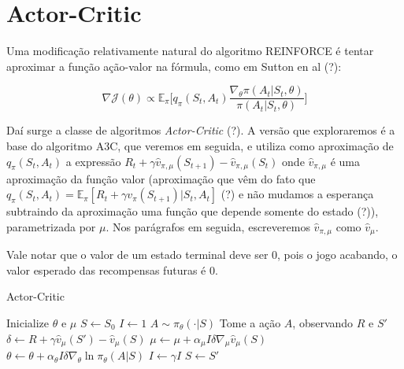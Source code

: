 \section{Actor-Critic}

Uma modificação relativamente natural do algoritmo REINFORCE é tentar aproximar a função ação-valor na fórmula, como em Sutton en al (?):

\begin{equation}
    \nabla \mathcal{J}(\theta) 
    \propto \mathbb{E}_{\pi} \Big[ q_{\pi}(S_t, A_t) \frac{\nabla_{\theta} \pi(A_t | S_t, \theta)}{\pi(A_t | S_t, \theta)} \Big]
\end{equation}

Daí surge a classe de algoritmos \textit{Actor-Critic} (?). A versão que exploraremos é a base do algoritmo A3C, que veremos em seguida, e utiliza como aproximação de $q_{\pi}(S_t, A_t)$ a expressão $R_{t} + \gamma \hat{v}_{\pi, \mu}(S_{t+1}) - \hat{v}_{\pi, \mu}(S_t)$ onde $\hat{v}_{\pi, \mu}$ é uma aproximação da função valor (aproximação que vêm do fato que $q_{\pi}(S_t, A_t) = \mathbb{E}_{\pi}[R_{t} + \gamma v_{\pi}(S_{t+1})|S_t, A_t]$ (?) e não mudamos a esperança subtraindo da aproximação uma função que depende somente do estado (?)), parametrizada por $\mu$. Nos parágrafos em seguida, escreveremos $\hat{v}_{\pi, \mu}$ como $\hat{v}_\mu$.

Vale notar que o valor de um estado terminal deve ser 0, pois o jogo acabando, o valor esperado das recompensas futuras é 0.

\begin{algorithm}
\caption{Actor-Critic}\label{ac}
\begin{algorithmic}[1]
\State Inicialize $\theta$ e $\mu$
    \State $S\gets S_0$
    \State $I\gets 1$
        \State $A \sim \pi_{\theta}(\cdot|S)$
        \State Tome a ação $A$, observando $R$ e $S'$
        \State $\delta\gets R + \gamma \hat{v}_{\mu}(S') - \hat{v}_{\mu}(S)$
        \State $\mu\gets \mu + \alpha_\mu I \delta \nabla_{\mu}\hat{v}_\mu(S)$
        \State $\theta\gets \theta + \alpha_\theta I \delta \nabla_{\theta}\ln \pi_\theta(A | S)$
        \State $I\gets \gamma I$
        \State $S\gets S'$
    \EndWhile
\EndWhile
\EndProcedure
\end{algorithmic}
\end{algorithm}

